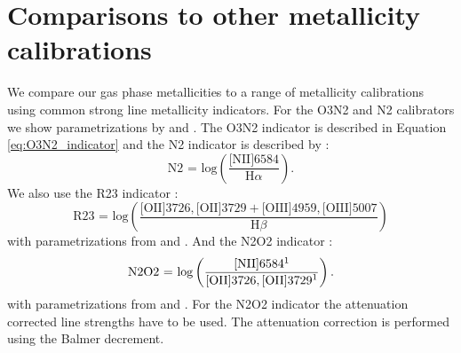 \documentclass[fleqn,usenatbib]{mnras}
\begin{document}








\appendix

\section{Comparisons to other metallicity calibrations}
\label{sec:appendix_metallicities}

We compare our gas phase metallicities to a range of metallicity calibrations using common strong line metallicity indicators. For the O3N2 and N2 calibrators we show parametrizations by \cite{pettini2004, nagao2006, maiolino2008, marino2013, brown2016} and \cite{curti2017}. The O3N2 indicator is described in Equation \ref{eq:O3N2_indicator} and the N2 indicator is described by \citep{storchi-bergmann1994}:
\begin{equation}
    \textrm{N2 = log}\left(\frac{\textrm{[NII]}6584}{\textrm{H}\alpha}\right).
\end{equation}
We also use the R23 indicator \citep{pagel1979}:
\begin{equation}
    \textrm{R23 = log}\left(\frac{\textrm{[OII]}3726, \textrm{[OII]}3729 + \textrm{[OIII]}4959, \textrm{[OIII]}5007}{\textrm{H}\beta}\right)
\end{equation}
with parametrizations from \cite{mcgaugh1991, zaritsky1994, nagao2006, maiolino2008} and \cite{curti2017}. And the N2O2 indicator \citep{alloin1979}:
\begin{equation}
    \textrm{N2O2 = log}\left(\frac{\textrm{[NII]}6584\textrm{\footnotemark[1]}}{\textrm{[OII]}3726, \textrm{[OII]}3729\textrm{\footnotemark[1]}}\right).
\end{equation}
with parametrizations from \cite{kewley2002, nagao2006} and \cite{brown2016}. For the N2O2 indicator the attenuation corrected line strengths have to be used. The attenuation correction is performed using the Balmer decrement. 
\end{document}
